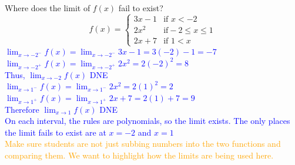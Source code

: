 \documentclass{ximera}
\begin{document}
\begin{exercise}
    Where does the limit of $f(x)$ fail to exist?  
      \[f(x)=
    \begin{cases}
    3x-1 &\text{if }x<-2\\
    2x^2 &\text{if} -2\leq x\leq 1\\
    2x+7 & \text{if } 1<x
    \end{cases}\]
    \textcolor{blue}{ $\displaystyle \lim_{x\rightarrow -2^-}f(x)=\lim_{x\rightarrow -2^-} 3x-1=3(-2)-1=-7$\\
    $\displaystyle \lim_{x\rightarrow -2^+} f(x)=\lim_{x\rightarrow -2^+ }2x^2=2(-2)^2=8$\\
    Thus, $\displaystyle \lim_{x\rightarrow -2}f(x)$ DNE\\
    $\displaystyle\lim_{x\rightarrow 1^-} f(x)=\lim_{x\rightarrow 1^-} 2x^2=2(1)^2=2$\\
    $\displaystyle\lim_{x\rightarrow 1^+} f(x)=\lim_{x\rightarrow 1^+} 2x+7=2(1)+7=9$\\
    Therefore $\displaystyle\lim_{x\rightarrow 1} f(x)$ DNE\\
    On each interval, the rules are polynomials, so the limit exists.  The only places the limit fails to exist are at $x=-2$ and $x=1$} \\
    \textcolor{orange}{Make sure students are not just subbing numbers into the two functions and comparing them.  We want to highlight how the limits are being used here.}
\end{exercise}
\end{document}
